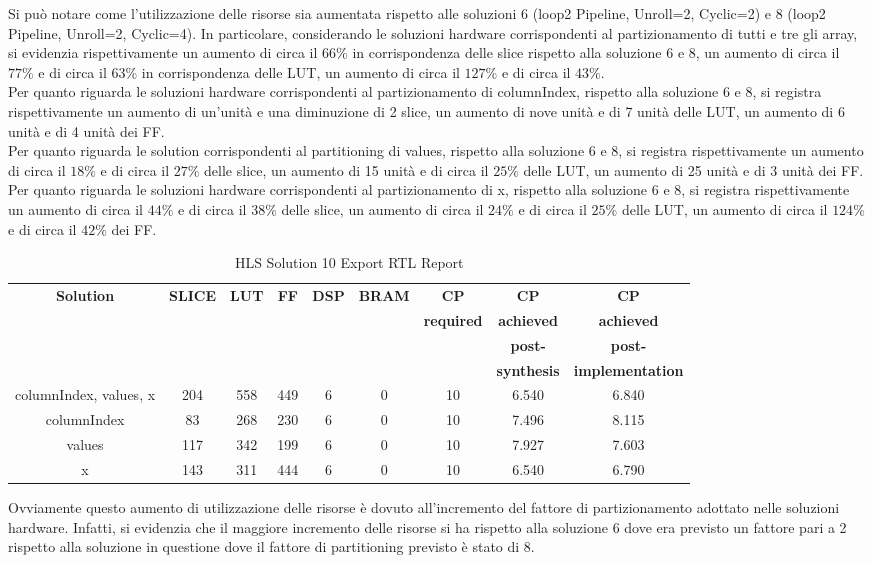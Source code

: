 Si può notare come l'utilizzazione delle risorse sia aumentata rispetto alle soluzioni 6 (loop2 Pipeline, Unroll=2, Cyclic=2) e 8 (loop2 Pipeline, Unroll=2, Cyclic=4). In particolare, considerando le soluzioni hardware corrispondenti al partizionamento di tutti e tre gli array, si evidenzia rispettivamente un aumento di circa il $66\%$ in corrispondenza delle slice rispetto alla soluzione 6 e 8, un aumento di circa il $77\%$ e di circa il $63\%$ in corrispondenza delle LUT, un aumento di circa il $127\%$ e di circa il $43\%$. 
\\
Per quanto riguarda le soluzioni hardware corrispondenti al partizionamento di columnIndex, rispetto alla soluzione 6 e 8, si registra rispettivamente un aumento di un'unità e una diminuzione di 2 slice, un aumento di nove unità e di 7 unità delle LUT, un aumento di 6 unità e di 4 unità dei FF. 
\\
Per quanto riguarda le solution corrispondenti al partitioning di values, rispetto alla soluzione 6 e 8, si registra rispettivamente un aumento di circa il $18\%$ e di circa il $27\%$ delle slice, un aumento di 15 unità e di circa il $25\%$ delle LUT, un aumento di 25 unità e di 3 unità dei FF. 
\\
Per quanto riguarda le soluzioni hardware corrispondenti al partizionamento di x, rispetto alla soluzione 6 e 8, si registra rispettivamente un aumento di circa il $44\%$ e di circa il $38\%$ delle slice, un aumento di circa il $24\%$ e di circa il $25\%$ delle LUT, un aumento di circa il $124\%$ e di circa il $42\%$ dei FF.

\begin{table}[H]
	\centering
	\begin{tabular}{|c|c|c|c|c|c|c|c|c|}
		\hline
		\textbf{Solution} & \textbf{SLICE} & \textbf{LUT} & \textbf{FF} & \textbf{DSP} & \textbf{BRAM} & \textbf{CP} & \textbf{CP} & \textbf{CP} \\
		& & & & & & \textbf{required} & \textbf{achieved} & \textbf{achieved}\\
		& & & & & & & \textbf{post-} & \textbf{post-}\\
		& & & & & & & \textbf{synthesis} & \textbf{implementation}\\
		\hline
		columnIndex, values, x  & 204 & 558 & 449 & 6 & 0 & 10 & 6.540 & 6.840 \\
		\hline
		columnIndex  & 83 & 268 & 230 & 6 & 0 & 10 & 7.496 & 8.115 \\
		\hline
		values  & 117 & 342 & 199 & 6 & 0 & 10 & 7.927 & 7.603 \\
		\hline
		x  & 143 & 311 & 444 & 6 & 0 & 10 & 6.540 & 6.790 \\
		\hline
	\end{tabular}
	\caption{HLS Solution 10 Export RTL Report}
	\label{tab:hls-solution-10-export-rtl-report}
\end{table}

Ovviamente questo aumento di utilizzazione delle risorse è dovuto all'incremento del fattore di partizionamento adottato nelle soluzioni hardware. Infatti, si evidenzia che il maggiore incremento delle risorse si ha rispetto alla soluzione 6 dove era previsto un fattore pari a 2 rispetto alla soluzione in questione dove il fattore di partitioning previsto è stato di 8.